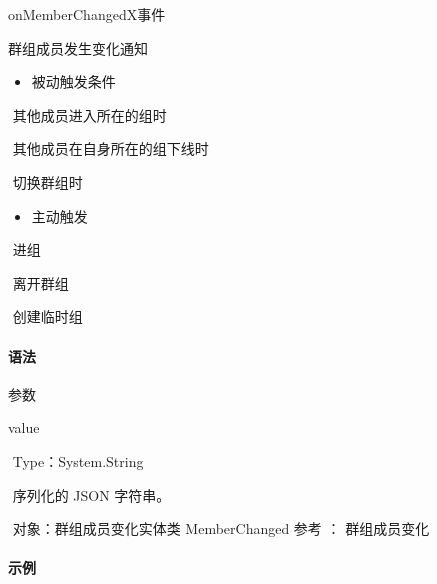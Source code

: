 \documentclass[letterpaper,10pt,english]{sphinxmanual}
\begin{document}
onMemberChangedX事件



群组成员发生变化通知
\begin{itemize}
\item {} 
被动触发条件

\end{itemize}

​ 其他成员进入所在的组时

​ 其他成员在自身所在的组下线时

​ 切换群组时
\begin{itemize}
\item {} 
主动触发

\end{itemize}

​ 进组

​ 离开群组

​ 创建临时组


\paragraph{语法}
\label{\detokenize{csharp_activex:id81}}
%
\begin{sphinxVerbatim}[commandchars=\\\{\}]
  
\end{sphinxVerbatim}

参数

value

​ Type：System.String

​ 序列化的 JSON 字符串。

​ 对象：群组成员变化实体类 MemberChanged 参考 ： 群组成员变化


\paragraph{示例}
\label{\detokenize{csharp_activex:id82}}
%
\begin{sphinxVerbatim}[commandchars=\\\{\}]
    
      

\end{sphinxVerbatim}
\end{document}
